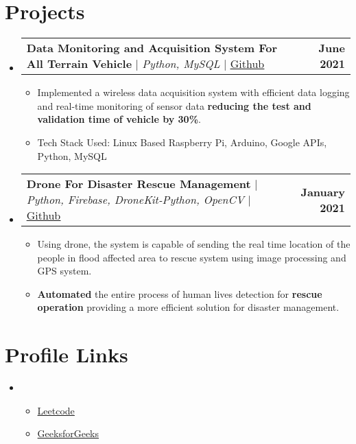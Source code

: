 \documentclass[letterpaper,11pt]{article}
\makeatletter
\newcommand{\resumeItem}[1]{
  \item\small{
	{#1 \vspace{-2pt}}
  }
}
\newcommand{\resumeProjectHeading}[2]{
	\item
	\begin{tabular*}{1.001\textwidth}{l@{\extracolsep{\fill}}r}
  	\small#1 & \textbf{\small #2}\\
	\end{tabular*}\vspace{-7pt}
}
\newcommand{\resumeSubHeadingListStart}{\begin{itemize}[leftmargin=0.0in, label={}]}
\newcommand{\resumeSubHeadingListEnd}{\end{itemize}}
\newcommand{\resumeItemListStart}{\begin{itemize}}
\newcommand{\resumeItemListEnd}{\end{itemize}\vspace{-5pt}}
\makeatother
\begin{document}
\section{Projects}
	\vspace{-5pt}
	\resumeSubHeadingListStart
	\resumeProjectHeading
      	{\textbf{Data Monitoring and Acquisition System For All Terrain Vehicle} $|$ \emph{Python, MySQL} $|$ {{\href{https://github.com/MasterZesty/}{\underline{Github}}}}}{June 2021}
      	\resumeItemListStart
        	\resumeItem{Implemented a wireless data acquisition system with efficient data logging and real-time monitoring of sensor data \textbf{reducing the test and validation time of vehicle by 30\%}.}
        	\resumeItem{Tech Stack Used: Linux Based Raspberry Pi, Arduino, Google APIs, Python, MySQL}
      	\resumeItemListEnd
	\vspace{-13pt}
  	\resumeProjectHeading
      	{\textbf{Drone For Disaster Rescue Management} $|$ \emph{Python, Firebase, DroneKit-Python, OpenCV}  $|$ {{\href{https://github.com/MasterZesty/}{\underline{Github}}}}}{January 2021}
      	\resumeItemListStart
        	\resumeItem{Using drone, the system is capable of sending the real time location of the people in flood affected area to rescue system using image processing and GPS system.}
        	\resumeItem{\textbf{Automated} the entire process of human lives detection for \textbf{rescue operation} providing a more efficient solution for disaster management.}
      	\resumeItemListEnd
	\resumeSubHeadingListEnd
\vspace{-15pt}


%
\section{Profile Links}
 \begin{itemize}[leftmargin=0.15in, label={}]
 \item
	\resumeItemListStart
    	\resumeItem {\href{https://leetcode.com/KrishnaNimbalkar/}{Leetcode}}
    	\resumeItem {\href{https://auth.geeksforgeeks.org/user/kgn272000/profile}{GeeksforGeeks}}
  	\resumeItemListEnd
 \end{itemize}
 \vspace{-16pt}


%
\end{document}
